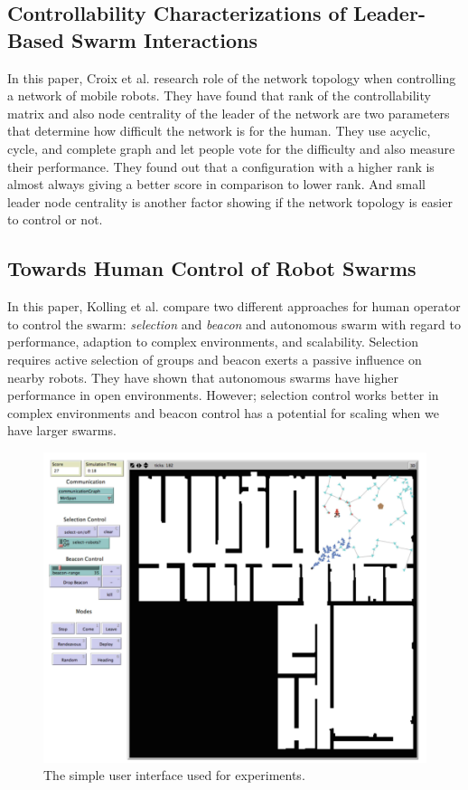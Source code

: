 \documentclass[letterpaper, 10 pt, conference]{ieeeconf}
\begin{document}
\subsection{Controllability Characterizations of Leader-Based Swarm Interactions}

In this paper, Croix et al. research role of the network topology when controlling a network of mobile robots. \cite{Croix2012} They have found that rank of the controllability matrix and also node centrality of the leader of the network are two parameters that determine how difficult the network is for the human. They use acyclic, cycle, and complete graph and let people vote for the difficulty and also measure their performance. They found out that a configuration with a higher rank is almost always giving a better score in comparison to lower rank. And small leader node centrality is another factor showing if the network topology is easier to control or not.

\subsection{Towards Human Control of Robot Swarms}

In this paper, Kolling et al. compare two different approaches for human operator to control the swarm: \emph{selection} and \emph{beacon} and autonomous swarm with regard to performance, adaption to complex environments, and scalability.\cite{Lewis2012} Selection requires active selection of groups and beacon exerts a passive influence on nearby robots. They have shown that autonomous swarms have higher performance in open environments. However; selection control works better in complex environments and beacon control has a potential for scaling when we have larger swarms. 
\begin{figure}[h]
\begin{center}
\includegraphics[width=\columnwidth]{Kolling.png}
\caption{The simple user interface used for experiments.\cite{Lewis2012}
\label{fig:kolling}}
\end{center}
\end{figure}
 


\end{document}
